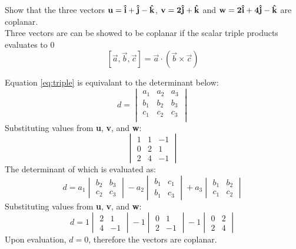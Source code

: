 Show that the three vectors $\bf{u}=\hat{i}+\hat{j}-\hat{k}$, $\bf{v}=2\hat{j}+\hat{k}$ and $\bf{w}=2\hat{i}+4\hat{j}-\hat{k}$ are coplanar. \\

\noindent Three vectors are can be showed to be coplanar if the scalar triple products evaluates to $0$
\begin{equation}
	\left[\vec{a},\vec{b},\vec{c}\right]=\vec{a}\cdot\left(\vec{b}\times\vec{c}\right)
	\label{eq:triple}
\end{equation}

Equation \ref{eq:triple} is equivalant to the determinant below:
\begin{equation}
d=
\begin{vmatrix} 
a_1 & a_2 & a_3 \\
b_1 & b_2 & b_3 \\
c_1 & c_2 & c_3 \\
\end{vmatrix}
\end{equation}
Substituting values from \textbf{u}, \textbf{v}, and \textbf{w}:
$$
\begin{vmatrix}
1& 1&-1\\
0 & 2 &1\\
2&4&-1
\end{vmatrix}
$$
The determinant of which is evaluated as:
\begin{equation}
	d= a_1 \begin{vmatrix} b_2 & b_3 \\ c_2 & c_3\end{vmatrix}
	    -a_2 \begin{vmatrix} b_1 & c_1 \\ b_1 & c_3\end{vmatrix}
	   +a_3\begin{vmatrix} b_1 & b_2 \\ c_1 & c_2\end{vmatrix}
\end{equation}
Substituting values from \textbf{u}, \textbf{v}, and \textbf{w}:
\begin{equation*}
	d= 1 \begin{vmatrix} 2 & 1 \\ 4 & -1\end{vmatrix}
	    -1 \begin{vmatrix}0 & 1 \\ 2 & -1\end{vmatrix}
	   -1\begin{vmatrix} 0 & 2 \\ 2& 4\end{vmatrix}
\end{equation*}
Upon evaluation, $d=0$, therefore the vectors are coplanar.


